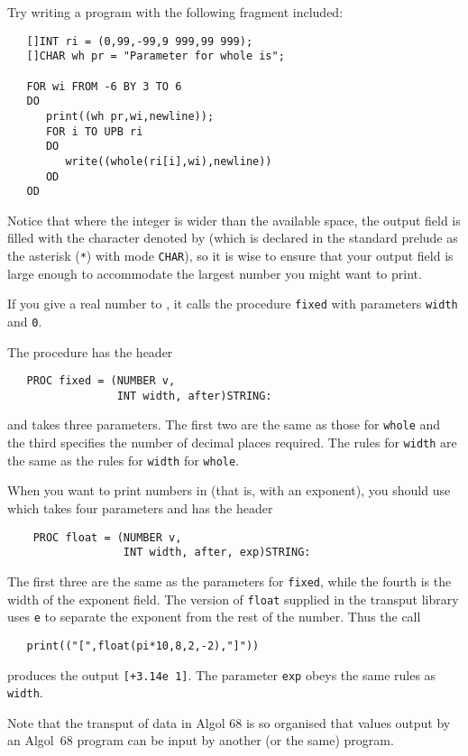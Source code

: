 Try writing a program with the following fragment included:
\begin{verbatim}
   []INT ri = (0,99,-99,9 999,99 999);
   []CHAR wh pr = "Parameter for whole is";
   
   FOR wi FROM -6 BY 3 TO 6
   DO
      print((wh pr,wi,newline));
      FOR i TO UPB ri
      DO
         write((whole(ri[i],wi),newline))
      OD
   OD
\end{verbatim}
\noindent
Notice that where the integer is wider than the available space, the
output field is filled with the character denoted by
 (which is declared in the standard prelude as the
asterisk (\verb|*|) with mode \verb|CHAR|), so it is wise to ensure
that your output field is large enough to accommodate the largest
number you might want to print.

If you give a real number to , it calls
the procedure \verb|fixed| with parameters \verb|width| and \verb|0|.

The procedure  has the header
\begin{verbatim}
   PROC fixed = (NUMBER v,
                 INT width, after)STRING:
\end{verbatim}
\noindent
and takes three parameters.  The first two are the same as those for
\verb|whole| and the third specifies the number of decimal places
required.  The rules for \verb|width| are the same as the rules for
\verb|width| for \verb|whole|.

When you want to print numbers in  (that is,
with an exponent), you should use  which takes four
parameters and has the header
\begin{verbatim}
    PROC float = (NUMBER v,
                  INT width, after, exp)STRING:
\end{verbatim}
\noindent
The first three are the same as the parameters for \verb|fixed|,
while the fourth is the width of the exponent field.  The version of
\verb|float| supplied in the transput library uses \verb|e| to
separate the exponent from the rest of the number. Thus the call
\begin{verbatim}
   print(("[",float(pi*10,8,2,-2),"]"))
\end{verbatim}
\noindent
produces the output \verb|[+3.14e 1]|. The parameter \verb|exp| obeys
the same rules as \verb|width|.

Note that the transput of data in Algol 68 is so organised that values
output by an Algol~68 program can be input by another (or the same)
program.

